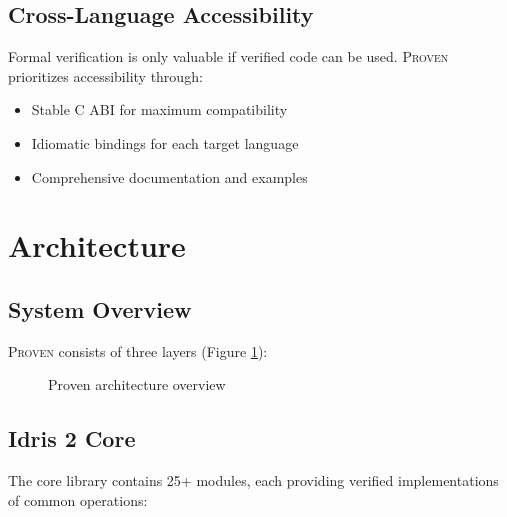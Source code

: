 \documentclass[11pt,a4paper]{article}
\newcommand{\proven}{\textsc{Proven}}
\begin{document}
\subsection{Cross-Language Accessibility}

Formal verification is only valuable if verified code can be used. \proven{} prioritizes accessibility through:

\begin{itemize}
    \item Stable C ABI for maximum compatibility
    \item Idiomatic bindings for each target language
    \item Comprehensive documentation and examples
\end{itemize}

\section{Architecture}

\subsection{System Overview}

\proven{} consists of three layers (Figure \ref{fig:architecture}):

\begin{figure}[ht]
\centering
{}
\caption{Proven architecture overview}
\label{fig:architecture}
\end{figure}

\subsection{Idris 2 Core}

The core library contains 25+ modules, each providing verified implementations of common operations:
\end{document}
